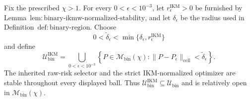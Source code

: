 Fix the prescribed \(\chi>1\). For every \(0<\epsilon<10^{-3}\), let \(r_\epsilon^{\mathrm{IKM}}>0\) be furnished by Lemma~\(\mathrm{lem{:}binary\text{-}ikmw\text{-}normalized\text{-}stability}\), and let \(\delta_\epsilon\) be the radius used in Definition~\(\mathrm{def{:}binary\text{-}region}\). Choose
\[
 0<\widetilde\delta_\epsilon
 <\min\{\delta_\epsilon,r_\epsilon^{\mathrm{IKM}}\}
\]
and define
\[
 \mathcal U_{\mathrm{bin}}^{\mathrm{IKM}}
 =\bigcup_{0<\epsilon<10^{-3}}
 \left\{P\in\mathcal M_{\mathrm{bin}}(\chi):
 \|P-P_\epsilon\|_{\mathrm{cell}}<\widetilde\delta_\epsilon\right\}. \tag{1}
\]
The inherited raw-risk selector and the strict IKM-normalized optimizer are stable throughout every displayed ball. Thus \(\mathcal U_{\mathrm{bin}}^{\mathrm{IKM}}\subseteq\mathcal U_{\mathrm{bin}}\) and is relatively open in \(\mathcal M_{\mathrm{bin}}(\chi)\).